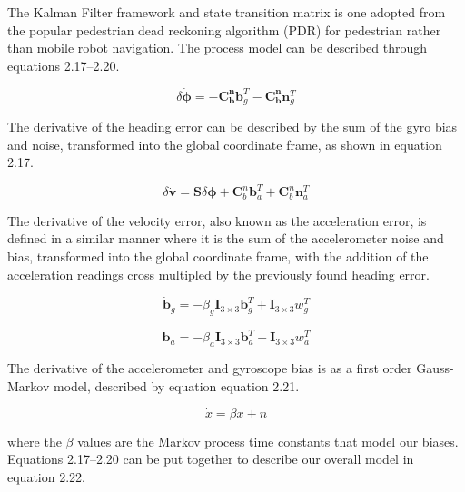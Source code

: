 The Kalman Filter framework and state transition matrix is one adopted from the 
popular pedestrian dead reckoning algorithm (PDR) for pedestrian rather than mobile 
robot navigation. The process model can be described through equations 2.17--2.20. 

\begin{equation}
  \delta{\dot{\boldsymbol{\phi}}} = 
  - \boldsymbol{C_b^n}\boldsymbol{b}_g^T - \boldsymbol{C_b^n}\boldsymbol{n}_g^T
\end{equation}  

The derivative of the heading error can be described by the sum of the gyro bias 
and noise, transformed into the global coordinate frame, as shown in equation 2.17.

\begin{equation}
  \delta{\dot{\boldsymbol{v}}} = 
  \boldsymbol{S}\delta\boldsymbol{\phi} + \boldsymbol{C}^n_b\boldsymbol{b}_a^T + \boldsymbol{C}^n_b\boldsymbol{n}^T_a
\end{equation}  

The derivative of the velocity error, also known as the acceleration error, is 
defined in a similar manner where it is the sum of the accelerometer noise and 
bias, transformed into the global coordinate frame, with the addition of the 
acceleration readings cross multipled by the previously found heading error. 

\begin{equation}
  \dot{\boldsymbol{b}}_g = 
  - \beta_g\boldsymbol{I}_{3\times3}\boldsymbol{b}_g^T + \boldsymbol{I}_{3\times3}w_g^T
\end{equation}  

\begin{equation}
  \dot{\boldsymbol{b}}_a = 
  - \beta_a\boldsymbol{I}_{3\times3}\boldsymbol{b}_a^T + \boldsymbol{I}_{3\times3}w_a^T
\end{equation}  

The derivative of the accelerometer and gyroscope bias is as a first order Gauss-Markov model,
described by equation equation 2.21.

\begin{equation}
  \dot{x} = \beta x + n
\end{equation}

where the $\beta$ values are the Markov process time constants that model our
biases. Equations 2.17--2.20 can be put together to describe our overall model 
in equation 2.22. 


